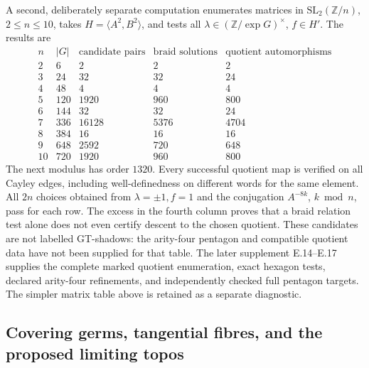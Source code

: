 A second, deliberately separate computation enumerates matrices in
$\mathrm{SL}_2(\mathbb Z/n)$, $2\leq n\leq10$, takes
$H=\langle A^2,B^2\rangle$, and tests all
$\lambda\in(\mathbb Z/\exp G)^\times$, $f\in H'$.  The results are
\[
\begin{array}{c|r|r|r|r}
 n&|G|&\text{candidate pairs}&\text{braid solutions}&
 \text{quotient automorphisms}\\\hline
 2&6&2&2&2\\3&24&32&32&24\\4&48&4&4&4\\
 5&120&1920&960&800\\6&144&32&32&24\\
 7&336&16128&5376&4704\\8&384&16&16&16\\
 9&648&2592&720&648\\10&720&1920&960&800
\end{array}
\]
The next modulus has order $1320$.  Every successful quotient map is
verified on all Cayley edges, including well-definedness on different
words for the same element.  All $2n$ choices obtained from
$\lambda=\pm1,f=1$ and the conjugation $A^{-8k}$, $k\bmod n$, pass
for each row.  The excess in the fourth column proves that a braid
relation test alone does not even certify descent to the chosen
quotient.  These candidates are not labelled GT-shadows: the
arity-four pentagon and compatible quotient data have not been
supplied for that table.  The later supplement E.14--E.17 supplies the complete marked
quotient enumeration, exact hexagon tests, declared arity-four
refinements, and independently checked full pentagon targets.
The simpler matrix table above is retained as a separate diagnostic.

\subsection{Covering germs, tangential fibres, and the proposed limiting topos}

